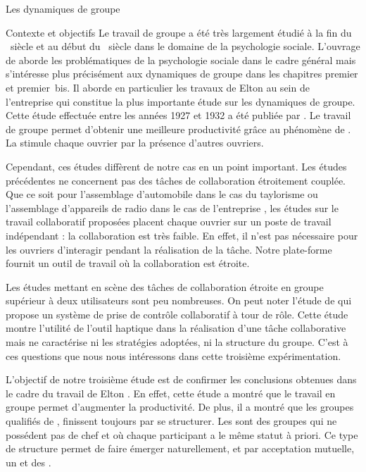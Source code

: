 \documentclass[myfrancais]{mythesis}
\begin{document}
\begin{mychapter}{Les dynamiques de groupe}
\begin{mysection}{Contexte et objectifs}
			Le travail de groupe a été très largement étudié à la fin du ~siècle et au début du ~siècle dans le domaine de la psychologie sociale.
			L'ouvrage de  aborde les problématiques de la psychologie sociale dans le cadre général mais s'intéresse plus précisément aux dynamiques de groupe dans les chapitres premier et premier~bis.
			Il aborde en particulier les travaux de Elton  au sein de l'entreprise \myHawthorne qui constitue la plus importante étude sur les dynamiques de groupe.
			Cette étude effectuée entre les années 1927 et 1932 a été publiée par .
			Le travail de groupe permet d'obtenir une meilleure productivité grâce au phénomène de .
			La  stimule chaque ouvrier par la présence d'autres ouvriers.

			Cependant, ces études diffèrent de notre cas en un point important.
			Les études précédentes ne concernent pas des tâches de collaboration étroitement couplée.
			Que ce soit pour l'assemblage d'automobile dans le cas du taylorisme ou l'assemblage d'appareils de radio dans le cas de l'entreprise \myHawthorne, les études sur le travail collaboratif proposées placent chaque ouvrier sur un poste de travail indépendant : la collaboration est très faible.
			En effet, il n'est pas nécessaire pour les ouvriers d'interagir pendant la réalisation de la tâche.
			Notre plate-forme fournit un outil de travail où la collaboration est étroite.

			Les études mettant en scène des tâches de collaboration étroite en groupe supérieur à deux utilisateurs sont peu nombreuses.
			On peut noter l'étude de  qui propose un système de prise de contrôle collaboratif à tour de rôle.
			Cette étude montre l'utilité de l'outil haptique dans la réalisation d'une tâche collaborative mais ne caractérise ni les stratégies adoptées, ni la structure du groupe.
			C'est à ces questions que nous nous intéressons dans cette troisième expérimentation.

			L'objectif de notre troisième étude est de confirmer les conclusions obtenues dans le cadre du travail de Elton .
			En effet, cette étude a montré que le travail en groupe permet d'augmenter la productivité.
			De plus, il a montré que les groupes qualifiés de , finissent toujours par se structurer.
			Les  sont des groupes qui ne possédent pas de chef et où chaque participant a le même statut à priori.
			Ce type de structure permet de faire émerger naturellement, et par acceptation mutuelle, un  et des .


\end{mysection}
\end{mychapter}
\end{document}
